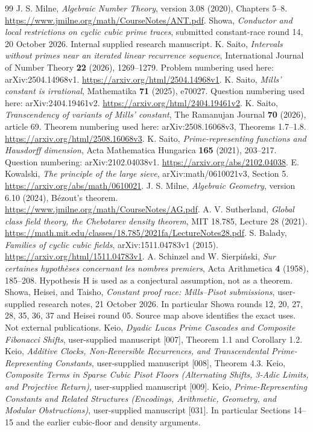 \documentclass[11pt,a4paper]{article}
\theoremstyle{remark}\newtheorem{remark}[theorem]{Remark}
\begin{document}
\begin{thebibliography}{99}
 J. S. Milne, \emph{Algebraic Number Theory},
version 3.08 (2020), Chapters 5--8.
\url{https://www.jmilne.org/math/CourseNotes/ANT.pdf}.
 Showa, \emph{Conductor and local restrictions on cyclic
cubic prime traces}, submitted constant-race round 14,
20 October 2026. Internal supplied research manuscript.
 K. Saito,
\emph{Intervals without primes near an iterated linear recurrence sequence},
International Journal of Number Theory \textbf{22} (2026), 1269--1279.
Problem numbering used here: arXiv:2504.14968v1.
\url{https://arxiv.org/html/2504.14968v1}.
 K. Saito, \emph{Mills' constant is irrational},
Mathematika \textbf{71} (2025), e70027.
Question numbering used here: arXiv:2404.19461v2.
\url{https://arxiv.org/html/2404.19461v2}.
 K. Saito,
\emph{Transcendency of variants of Mills' constant},
The Ramanujan Journal \textbf{70} (2026), article 69.
Theorem numbering used here: arXiv:2508.16068v3, Theorems 1.7--1.8.
\url{https://arxiv.org/html/2508.16068v3}.
 K. Saito,
\emph{Prime-representing functions and Hausdorff dimension},
Acta Mathematica Hungarica \textbf{165} (2021), 203--217.
Question numbering: arXiv:2102.04038v1.
\url{https://arxiv.org/abs/2102.04038}.
 E. Kowalski,
\emph{The principle of the large sieve}, arXiv:math/0610021v3,
Section 5. \url{https://arxiv.org/abs/math/0610021}.
 J. S. Milne, \emph{Algebraic Geometry},
version 6.10 (2024), B\'ezout's theorem.
\url{https://www.jmilne.org/math/CourseNotes/AG.pdf}.
 A. V. Sutherland,
\emph{Global class field theory, the Chebotarev density theorem},
MIT 18.785, Lecture 28 (2021).
\url{https://math.mit.edu/classes/18.785/2021fa/LectureNotes28.pdf}.
 S. Balady, \emph{Families of cyclic cubic fields},
arXiv:1511.04783v1 (2015).
\url{https://arxiv.org/html/1511.04783v1}.
 A. Schinzel and W. Sierpi\'nski,
\emph{Sur certaines hypoth\`eses concernant les nombres premiers},
Acta Arithmetica \textbf{4} (1958), 185--208.
Hypothesis H is used as a conjectural assumption, not as a theorem.
 Showa, Heisei, and Taisho,
\emph{Constant proof race: Mills--Pisot submissions},
user-supplied research notes, 21 October 2026. In particular Showa
rounds 12, 20, 27, 28, 35, 36, 37 and Heisei round 05.
Source map above identifies the exact uses. Not external publications.
 Keio,
\emph{Dyadic Lucas Prime Cascades and Composite Fibonacci Shifts},
user-supplied manuscript [007], Theorem 1.1 and Corollary 1.2.
 Keio,
\emph{Additive Clocks, Non-Reversible Recurrences, and Transcendental
Prime-Representing Constants}, user-supplied manuscript [008],
Theorem 4.3.
 Keio,
\emph{Composite Terms in Sparse Cubic Pisot Floors
(Alternating Shifts, 3-Adic Limits, and Projective Return)},
user-supplied manuscript [009].
 Keio,
\emph{Prime-Representing Constants and Related Structures
(Encodings, Arithmetic, Geometry, and Modular Obstructions)},
user-supplied manuscript [031]. In particular Sections 14--15 and
the earlier cubic-floor and density arguments.
\end{thebibliography}
\end{document}
